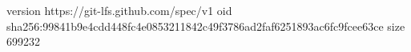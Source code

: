 version https://git-lfs.github.com/spec/v1
oid sha256:99841b9e4cdd448fc4e0853211842c49f3786ad2faf6251893ac6fc9fcee63ce
size 699232
